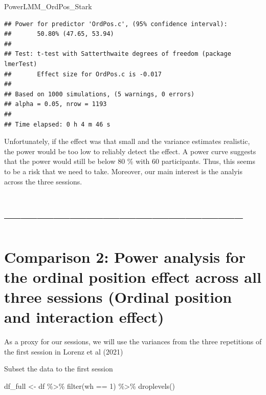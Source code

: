 \documentclass[
]{article}
\newenvironment{Shaded}{\begin{snugshade}}{\end{snugshade}}
\newcommand{\DecValTok}[1]{\textcolor[rgb]{0.00,0.00,0.81}{#1}}
\newcommand{\FunctionTok}[1]{\textcolor[rgb]{0.00,0.00,0.00}{#1}}
\newcommand{\NormalTok}[1]{#1}
\newcommand{\OtherTok}[1]{\textcolor[rgb]{0.56,0.35,0.01}{#1}}
\newcommand{\SpecialCharTok}[1]{\textcolor[rgb]{0.00,0.00,0.00}{#1}}
\begin{document}
\begin{Shaded}
\begin{Highlighting}[]
\NormalTok{PowerLMM\_OrdPos\_Stark}
\end{Highlighting}
\end{Shaded}

\begin{verbatim}
## Power for predictor 'OrdPos.c', (95% confidence interval):
##       50.80% (47.65, 53.94)
## 
## Test: t-test with Satterthwaite degrees of freedom (package lmerTest)
##       Effect size for OrdPos.c is -0.017
## 
## Based on 1000 simulations, (5 warnings, 0 errors)
## alpha = 0.05, nrow = 1193
## 
## Time elapsed: 0 h 4 m 46 s
\end{verbatim}

Unfortunately, if the effect was that small and the variance estimates
realistic, the power would be too low to reliably detect the effect. A
power curve suggests that the power would still be below 80 \% with 60
participants. Thus, this seems to be a risk that we need to take.
Moreover, our main interest is the analyis across the three sessions.

\hypertarget{section}{%
\section{--------------------------------------------}\label{section}}

\hypertarget{comparison-2-power-analysis-for-the-ordinal-position-effect-across-all-three-sessions-ordinal-position-and-interaction-effect}{%
\section{Comparison 2: Power analysis for the ordinal position effect
across all three sessions (Ordinal position and interaction
effect)}\label{comparison-2-power-analysis-for-the-ordinal-position-effect-across-all-three-sessions-ordinal-position-and-interaction-effect}}

As a proxy for our sessions, we will use the variances from the three
repetitions of the first session in Lorenz et al (2021)

Subset the data to the first session

\begin{Shaded}
\begin{Highlighting}[]
\NormalTok{df\_full }\OtherTok{\textless{}{-}}\NormalTok{ df }\SpecialCharTok{\%\textgreater{}\%} \FunctionTok{filter}\NormalTok{(wh }\SpecialCharTok{==} \DecValTok{1}\NormalTok{) }\SpecialCharTok{\%\textgreater{}\%} \FunctionTok{droplevels}\NormalTok{()}
\end{Highlighting}
\end{Shaded}
\end{document}
